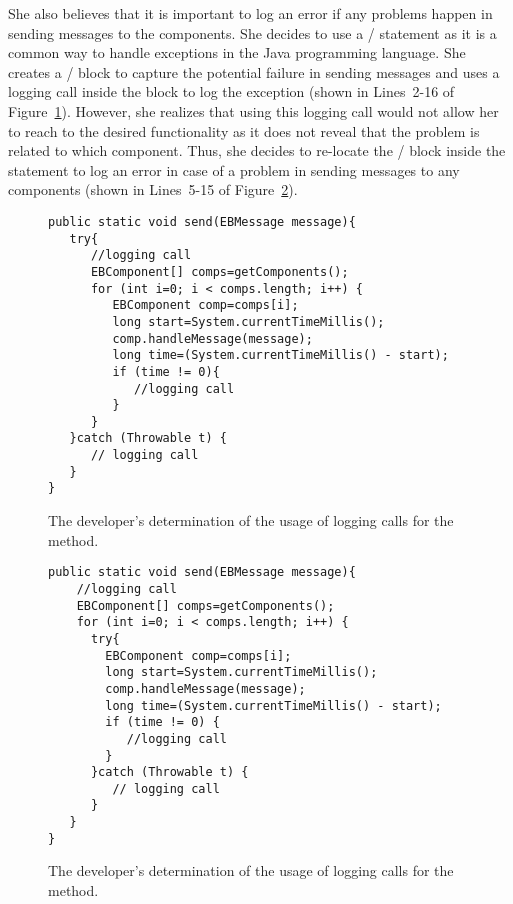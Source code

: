She also believes that it is important to log an error if any problems happen in sending messages to the components. She decides to use a / statement as it is a common way to handle exceptions in the Java programming language. She creates a / block to capture the potential failure in sending messages and uses a logging call inside the  block to log the exception (shown in Lines~2-16 of Figure~\ref{ch2-ex-logged-m3}). However, she realizes that using this logging call would not allow her to reach to the desired functionality as it does not reveal that the problem is related to which component. Thus, she decides to re-locate the / block inside the  statement to log an error in case of a problem in sending messages to any components (shown in Lines~5-15 of Figure~\ref{ch2-ex-logged-m4}).

\begin{figure}[H]
\def\baselinestretch{1}
\begin{lstlisting}
public static void send(EBMessage message){
   try{   
      //logging call
      EBComponent[] comps=getComponents();
      for (int i=0; i < comps.length; i++) {
         EBComponent comp=comps[i];
         long start=System.currentTimeMillis();
         comp.handleMessage(message);
         long time=(System.currentTimeMillis() - start);
         if (time != 0){
            //logging call
         }
      }
   }catch (Throwable t) {
      // logging call
   }
}
\end{lstlisting}
\caption{The developer’s determination of the usage of logging calls for the  method.\label{ch2-ex-logged-m3}}
\end{figure}

\begin{figure}[H]
\def\baselinestretch{1}
\begin{lstlisting}
public static void send(EBMessage message){
    //logging call
    EBComponent[] comps=getComponents();
    for (int i=0; i < comps.length; i++) {
      try{
        EBComponent comp=comps[i];
        long start=System.currentTimeMillis();
        comp.handleMessage(message);
        long time=(System.currentTimeMillis() - start);
        if (time != 0) {
           //logging call
        }
      }catch (Throwable t) {
         // logging call
      }
   }
}
\end{lstlisting}
\caption{The developer’s determination of the usage of logging calls for the  method.\label{ch2-ex-logged-m4}}
\end{figure}

